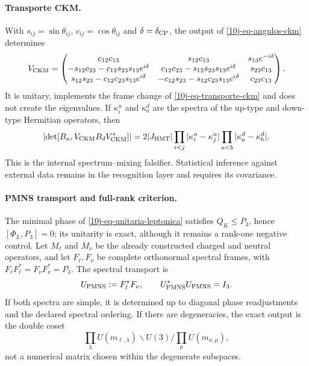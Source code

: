 \paragraph{Transporte CKM.}
With \(s_{ij}=\sin\theta_{ij}\), \(c_{ij}=\cos\theta_{ij}\) and \(\delta=\delta_{\rm CP}\), the output of \eqref{10j-eq-angulos-ckm} determines
\begin{equation}
 V_{\rm CKM}=\begin{pmatrix}
 c_{12}c_{13}&s_{12}c_{13}&s_{13}e^{-i\delta}\\
 -s_{12}c_{23}-c_{12}s_{23}s_{13}e^{i\delta}&
 c_{12}c_{23}-s_{12}s_{23}s_{13}e^{i\delta}&s_{23}c_{13}\\
 s_{12}s_{23}-c_{12}c_{23}s_{13}e^{i\delta}&
 -c_{12}s_{23}-s_{12}c_{23}s_{13}e^{i\delta}&c_{23}c_{13}
 \end{pmatrix}.
 \label{10j-eq-vckm-explicita}
\end{equation}
It is unitary, implements the frame change of \eqref{10j-eq-transporte-ckm} and does not create the eigenvalues. If \(\kappa_i^u\) and \(\kappa_a^d\) are the spectra of the up-type and down-type Hermitian operators, then
\begin{equation}
 \left|\det[B_u,V_{\rm CKM}B_dV_{\rm CKM}^*]\right|
 =2|J_{\rm HMT}|
 \prod_{i<j}|\kappa_i^u-\kappa_j^u|
 \prod_{a<b}|\kappa_a^d-\kappa_b^d|.
 \label{10j-eq-determinante-conmutador-ckm}
\end{equation}
This is the internal spectrum--mixing falsifier. Statistical inference against external data remains in the recognition layer and requires its covariance.

\paragraph{PMNS transport and full-rank criterion.}
The minimal phase of \eqref{10j-eq-unitaria-leptonica} satisfies \(Q_K\leq P_3\), hence \([\Phi_L,P_3]=0\); its unitarity is exact, although it remains a rank-one negative control. Let \(M_\ell\) and \(M_\nu\) be the already constructed charged and neutral operators, and let \(F_\ell,F_\nu\) be complete orthonormal spectral frames, with \(F_\ell F_\ell^*=F_\nu F_\nu^*=P_3\). The spectral transport is
\begin{equation}
 U_{\rm PMNS}:=F_\ell^*F_\nu,
 \qquad U_{\rm PMNS}^*U_{\rm PMNS}=I_3.
 \label{10j-eq-pmns-marcos-espectrales}
\end{equation}
If both spectra are simple, it is determined up to diagonal phase readjustments and the declared spectral ordering. If there are degeneracies, the exact output is the double coset
\begin{equation}
 \prod_\lambda U(m_{\ell,\lambda})\backslash U(3)/
 \prod_\mu U(m_{\nu,\mu}),
 \label{10j-eq-pmns-clase-doble}
\end{equation}
not a numerical matrix chosen within the degenerate subspaces.

